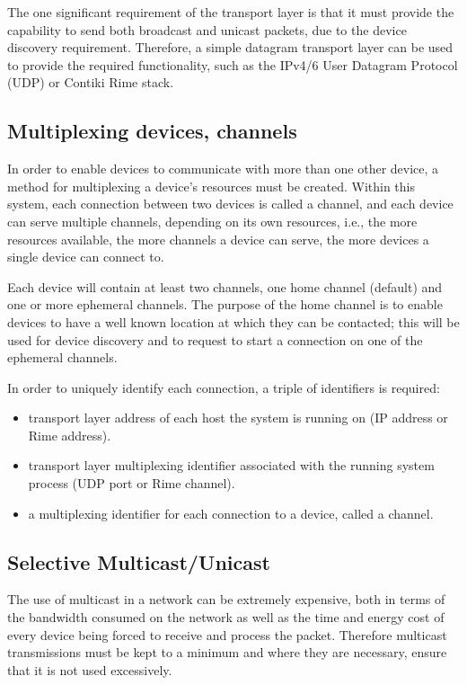 The one significant requirement of the transport layer is that it must provide the capability to send both broadcast and unicast packets, due to the device discovery requirement.
Therefore, a simple datagram transport layer can be used to provide the required functionality, such as the IPv4/6 User Datagram Protocol (UDP) or Contiki Rime stack\cite{RimeStack}.

\subsection{Multiplexing devices, channels}
In order to enable devices to communicate with more than one other device, a method for multiplexing a device's resources must be created. Within this system, each connection between two devices is called a channel, and each device can serve multiple channels, depending on its own resources, i.e., the more resources available, the more channels a device can serve, the more devices a single device can connect to. 

Each device will contain at least two channels, one home channel (default) and one or more ephemeral channels. The purpose of the home channel is to enable devices to have a well known location at which they can be contacted; this will be used for device discovery and to request to start a connection on one of the ephemeral channels.

In order to uniquely identify each connection, a triple of identifiers is required:
\begin{itemize}
	\item transport layer address of each host the system is running on (IP address or Rime address).
	\item transport layer multiplexing identifier associated with the running system process (UDP port or Rime channel).
	\item a multiplexing identifier for each connection to a device, called a channel.
\end{itemize}

\subsection{Selective Multicast/Unicast} %
\label{sub:selective_multicast_unicast}
The use of multicast in a network can be extremely expensive, both in terms of the bandwidth consumed on the network as well as the time and energy cost of every device being forced to receive and process the packet. Therefore multicast transmissions must be kept to a minimum and where they are necessary, ensure that it is not used excessively.

